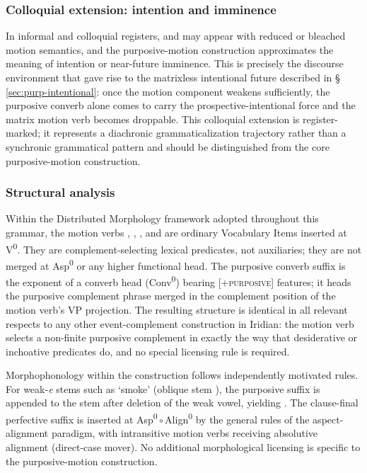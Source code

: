 \subsubsection{Colloquial extension: intention and
imminence}\label{sec:purp-motion-colloquial}

In informal and colloquial registers,  and  may appear
with reduced or bleached motion semantics, and the purposive-motion construction
approximates the meaning of intention or near-future imminence. This is
precisely the discourse environment that gave rise to the matrixless intentional
future described in §\,\ref{sec:purp-intentional}: once the motion component
weakens sufficiently, the purposive converb alone comes to carry the
prospective-intentional force and the matrix motion verb becomes droppable. This
colloquial extension is register-marked; it represents a diachronic
grammaticalization trajectory rather than a synchronic grammatical pattern and
should be distinguished from the core purposive-motion construction.

\subsubsection{Structural analysis}\label{sec:purp-motion-structure}

Within the Distributed Morphology framework adopted throughout this grammar, the
motion verbs , , , and  are
ordinary Vocabulary Items inserted at V\textsuperscript{0}. They are
complement-selecting lexical predicates, not auxiliaries; they are not merged at
Asp\textsuperscript{0} or any higher functional head. The purposive converb
suffix  is the exponent of a converb head (Conv\textsuperscript{0})
bearing [\textsc{+purposive}] features; it heads the purposive complement phrase
merged in the complement position of the motion verb's VP projection. The
resulting structure is identical in all relevant respects to any other
event-complement construction in Iridian: the motion verb selects a non-finite
purposive complement in exactly the way that desiderative or inchoative
predicates do, and no special licensing rule is required.

Morphophonology within the construction follows independently motivated rules.
For weak-\textit{e} stems such as  `smoke' (oblique stem
), the purposive suffix  is appended to the stem after
deletion of the weak vowel, yielding . The clause-final perfective
suffix  is inserted at
Asp\textsuperscript{0}\,$\circ$\,Align\textsuperscript{0} by the general rules
of the aspect-alignment paradigm, with intransitive motion verbs receiving
absolutive alignment (direct-case mover). No additional morphological licensing
is specific to the purposive-motion construction.

